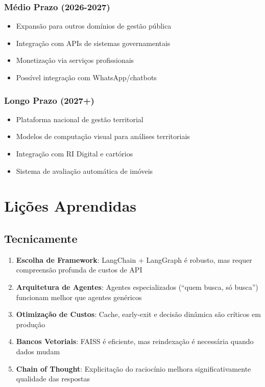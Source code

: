 \documentclass[12pt,a4paper]{report}
\begin{document}
\subsection{Médio Prazo (2026-2027)}

\begin{itemize}
  \item Expansão para outros domínios de gestão pública
  \item Integração com APIs de sistemas governamentais
  \item Monetização via serviços profissionais
  \item Possível integração com WhatsApp/chatbots
\end{itemize}

\subsection{Longo Prazo (2027+)}

\begin{itemize}
  \item Plataforma nacional de gestão territorial
  \item Modelos de computação visual para análises territoriais
  \item Integração com RI Digital e cartórios
  \item Sistema de avaliação automática de imóveis
\end{itemize}

\newpage

\chapter{Lições Aprendidas}

\section{Tecnicamente}

\begin{enumerate}
  \item \textbf{Escolha de Framework}: LangChain + LangGraph é robusto, mas requer compreensão profunda de custos de API
  \item \textbf{Arquitetura de Agentes}: Agentes especializados (``quem busca, só busca'') funcionam melhor que agentes genéricos
  \item \textbf{Otimização de Custos}: Cache, early-exit e decisão dinâmica são críticos em produção
  \item \textbf{Bancos Vetoriais}: FAISS é eficiente, mas reindexação é necessária quando dados mudam
  \item \textbf{Chain of Thought}: Explicitação do raciocínio melhora significativamente qualidade das respostas
\end{enumerate}
\end{document}
